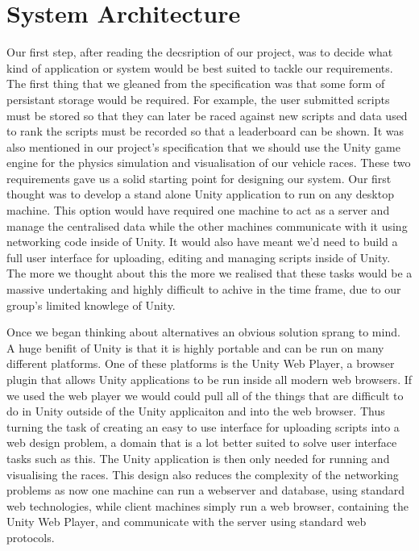 \section{System Architecture}

Our first step, after reading the decsription of our project, was to decide what kind of application or system would be best suited to tackle our requirements. The first thing that we gleaned from the specification was that some form of persistant storage would be required. For example, the user submitted scripts must be stored so that they can later be raced against new scripts and data used to rank the scripts must be recorded so that a leaderboard can be shown. It was also mentioned in our project's specification that we should use the Unity game engine for the physics simulation and visualisation of our vehicle races. These two requirements gave us a solid starting point for designing our system. Our first thought was to develop a stand alone Unity application to run on any desktop machine. This option would have required one machine to act as a server and manage the centralised data while the other machines communicate with it using networking code inside of Unity. It would also have meant we'd need to build a full user interface for uploading, editing and managing scripts inside of Unity. The more we thought about this the more we realised that these tasks would be a massive undertaking and highly difficult to achive in the time frame, due to our group's limited knowlege of Unity.

Once we began thinking about alternatives an obvious solution sprang to mind. A huge benifit of Unity is that it is highly portable and can be run on many different platforms. One of these platforms is the Unity Web Player, a browser plugin that allows Unity applications to be run inside all modern web browsers. If we used the web player we would could pull all of the things that are difficult to do in Unity outside of the Unity applicaiton and into the web browser. Thus turning the task of creating an easy to use interface for uploading scripts into a web design problem, a domain that is a lot better suited to solve user interface tasks such as this. The Unity application is then only needed for running and visualising the races. This design also reduces the complexity of the networking problems as now one machine can run a webserver and database, using standard web technologies, while client machines simply run a web browser, containing the Unity Web Player, and communicate with the server using standard web protocols.

